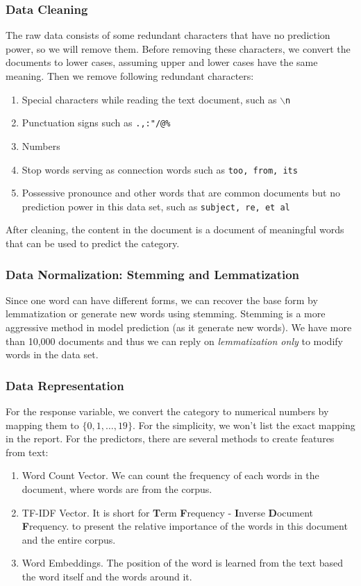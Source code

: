 \documentclass[11pt]{article}
\theoremstyle{remark}
\begin{document}
\subsubsection{Data Cleaning}

The raw data consists of some redundant characters that have no prediction power, so we will remove them. Before removing these characters, we convert the documents to lower cases, assuming upper and lower cases have the same meaning.
Then we remove following redundant characters:
\begin{enumerate}
	\item Special characters while reading the text document, such as \texttt{$\backslash$n}
	\item Punctuation signs such as \texttt{.,:"/@\%}
	\item Numbers
	\item Stop words serving as connection words such as \texttt{too, from, its}
	\item Possessive pronounce and other words that are common documents but no prediction power in this data set,  such as \texttt{subject, re, et al}
\end{enumerate}

After cleaning, the content in the document is a document of meaningful words that can be used to predict the category.

\subsubsection{Data Normalization: Stemming and Lemmatization}

Since one word can have different forms, we can recover the base form by lemmatization or generate new words using stemming. Stemming is a more aggressive method in model prediction (as it generate new words). We have more than 10,000 documents and thus we can reply on {\em lemmatization only} to modify words in the data set. 

\subsubsection{Data Representation}
\label{sec:data-reprep}
For the response variable, we convert the category to numerical numbers by mapping them to $\{0, 1, \ldots, 19\}$. For the simplicity, we won't list the exact mapping in the report.
For the predictors, there are several methods to create features from text:
\begin{enumerate}
	\item Word Count Vector. We can count the frequency of each words in the document, where words are from the corpus. 
	\item TF-IDF Vector. It is short for {\bf T}erm {\bf F}requency - {\bf I}nverse {\bf D}ocument {\bf F}requency.  to present the relative importance of the words in this document and the entire corpus. 
	\item Word Embeddings. The position of the word is learned from the text based the word itself and the words around it. 
\end{enumerate}
\end{document}
